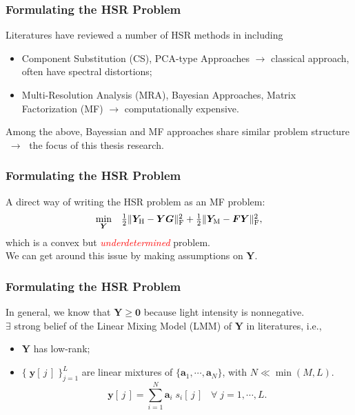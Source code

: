 \documentclass[10pt,mathserif]{beamer}
\newcommand{\YH}{\bm Y_\text H}
\newcommand{\YM}{\bm Y_\text M}
\newcommand{\Fr}{_\text F}
\newcommand{\ie}{i.e.,\,}
\begin{document}
    \begin{frame}
        \frametitle{Formulating the HSR Problem}
        Literatures have reviewed a number of HSR methods in
        \cite{HS_PANSHARPENING_A_REVIEW,HSMS_DATA_FUSION_A_COMPARATIVE_REVIEW} including
        \begin{itemize}
            \item Component Substitution (CS), PCA-type Approaches \newline
                  $\rightarrow$ classical approach, often have spectral distortions;
            \item Multi-Resolution Analysis (MRA), Bayesian Approaches, Matrix Factorization (MF) \newline
                  $\rightarrow$ computationally expensive.
        \end{itemize}
        Among the above, Bayessian and MF approaches share similar problem structure
        $\; \rightarrow \;$ the focus of this thesis research.
    \end{frame}
    \begin{frame}
        \frametitle{Formulating the HSR Problem}
        A direct way of writing the HSR problem as an MF problem:
        \[ \begin{array}{cl}
           \underset{\bm Y}{\min}
           &
           \frac{1}{2} \Vert \YH - \bm Y \bm G \Vert\Fr^2 +
           \frac{1}{2} \Vert \YM - \bm F \bm Y \Vert\Fr^2,
           \end{array} \]
        which is a convex but \textcolor{red}{\textit{underdetermined}} problem.\\
        \vspace{1cm}
        We can get around this issue by making assumptions on $\bm Y$.
    \end{frame}
    \begin{frame}
        \frametitle{Formulating the HSR Problem}
        In general, we know that $\bm Y \geq \bm 0$ because light intensity is nonnegative.\\
        \vspace{0.5cm}
        $\exists$ strong belief of the Linear Mixing Model (LMM) of $\bm Y$ in literatures, \ie
        \begin{itemize}
            \item $\bm Y$ has low-rank;
            \item $\{\;\bm y[\,j\,]\;\}_{j=1}^L$ are linear mixtures of
                  $\{\bm a_1,\cdots,\bm a_N\}$, with $N \ll \min(M,L)$.
                  \[ \bm y[\,j\,] = \sum_{i=1}^N \bm a_i \; s_i[\,j\,] \;\;\; \forall \; j=1,\cdots,L. \]
        \end{itemize}
    \end{frame}
\end{document}
